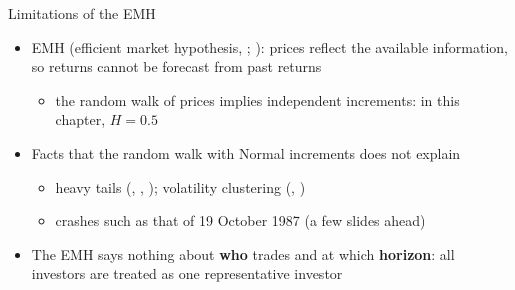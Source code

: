 \begin{frame}{Limitations of the EMH}
\itemsize{\small}
\begin{itemize}
    \item EMH (efficient market hypothesis, ; ): prices reflect the available information, so returns cannot be forecast from past returns
    \begin{itemize}
        \item the random walk of prices implies independent increments: in this chapter, $H = 0.5$
    \end{itemize}
    \item Facts that the random walk with Normal increments does not explain
    \begin{itemize}
        \item heavy tails (, , ); volatility clustering (, )
        \item crashes such as that of 19 October 1987 (a few slides ahead)
    \end{itemize}
    \item The EMH says nothing about \textbf{who} trades and at which \textbf{horizon}: all investors are treated as one representative investor
\end{itemize}
\end{frame}

